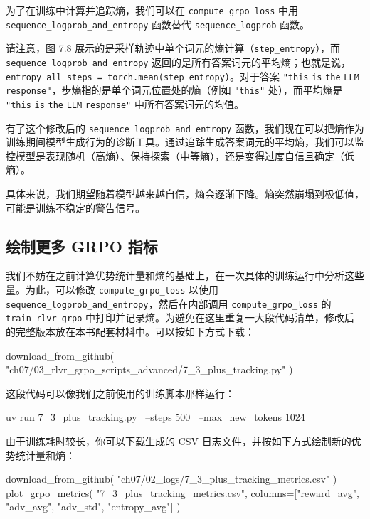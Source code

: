 为了在训练中计算并追踪熵，我们可以在 \texttt{compute\_grpo\_loss} 中用 \texttt{sequence\_logprob\_and\_entropy} 函数替代 \texttt{sequence\_logprob} 函数。

请注意，图 7.8 展示的是采样轨迹中单个词元的熵计算（\texttt{step\_entropy}），而 \texttt{sequence\_logprob\_and\_entropy} 返回的是所有答案词元的平均熵；也就是说，\texttt{entropy\_all\_steps = torch.mean(step\_entropy)}。对于答案 \texttt{"}\texttt{this} \texttt{is} \texttt{the} \texttt{LLM} \texttt{response}\texttt{"}，步熵指的是单个词元位置处的熵（例如 \texttt{"}\texttt{this}\texttt{"} 处），而平均熵是 \texttt{"}\texttt{this} \texttt{is} \texttt{the} \texttt{LLM} \texttt{response}\texttt{"} 中所有答案词元的均值。

有了这个修改后的 \texttt{sequence\_logprob\_and\_entropy} 函数，我们现在可以把熵作为训练期间模型生成行为的诊断工具。通过追踪生成答案词元的平均熵，我们可以监控模型是表现随机（高熵）、保持探索（中等熵），还是变得过度自信且确定（低熵）。

具体来说，我们期望随着模型越来越自信，熵会逐渐下降。熵突然崩塌到极低值，可能是训练不稳定的警告信号。

\subsection{绘制更多 GRPO 指标}

我们不妨在之前计算优势统计量和熵的基础上，在一次具体的训练运行中分析这些量。为此，可以修改 \texttt{compute\_grpo\_loss} 以使用 \texttt{sequence\_logprob\_and\_entropy}，然后在内部调用 \texttt{compute\_grpo\_loss} 的 \texttt{train\_rlvr\_grpo} 中打印并记录熵。为避免在这里重复一大段代码清单，修改后的完整版本放在本书配套材料中。可以按如下方式下载：

\begin{codebox}
download_from_github(
    "ch07/03_rlvr_grpo_scripts_advanced/7_3_plus_tracking.py"
)
\end{codebox}

这段代码可以像我们之前使用的训练脚本那样运行：

\begin{codebox}
uv run 7_3_plus_tracking.py \
    --steps 500  \
    --max_new_tokens 1024
\end{codebox}

由于训练耗时较长，你可以下载生成的 CSV 日志文件，并按如下方式绘制新的优势统计量和熵：

\begin{codebox}
download_from_github(
    "ch07/02_logs/7_3_plus_tracking_metrics.csv"
)
plot_grpo_metrics(
    "7_3_plus_tracking_metrics.csv",
    columns=["reward_avg", "adv_avg", "adv_std", "entropy_avg"]
)
\end{codebox}

